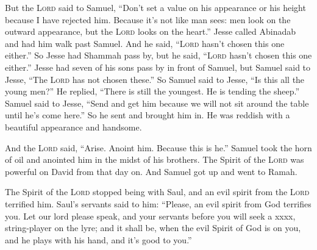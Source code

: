 \begin{inparaenum}
     But the \textsc{Lord} said to Samuel, ``Don't set a value on his appearance or his height because I have rejected him. Because it's not like man sees: men look on the outward appearance, but the \textsc{Lord} looks on the heart.''%
     Jesse called Abinadab and had him walk past Samuel. And he said, ``\textsc{Lord} hasn't chosen this one either.''%
     So Jesse had Shammah pass by, but he said, ``\textsc{Lord} hasn't chosen this one either.''%
     Jesse had seven of his sons pass by in front of Samuel, but Samuel said to Jesse, ``The \textsc{Lord} has not chosen these.''%
     So Samuel said to Jesse, ``Is this all the young men?'' He replied, ``There is still the youngest. He is tending the sheep.'' Samuel said to Jesse, ``Send and get him because we will not sit around the table until he's come here.''%
     So he sent and brought him in. He was reddish with a beautiful appearance and handsome.%
    
    And the \textsc{Lord} said, ``Arise. Anoint him. Because this is he.''%
     Samuel took the horn of oil and anointed him in the midst of his brothers. The Spirit of the \textsc{Lord} was powerful on David from that day on. And Samuel got up and went to Ramah.%
    
     The Spirit of the \textsc{Lord} stopped being with Saul, and an evil spirit from the \textsc{Lord} terrified him.%
     Saul's servants said to him: ``Please, an evil spirit from God terrifies you.%
     Let our lord please speak, and your servants before you will seek a xxxx, string-player on the lyre; and it shall be, when the evil Spirit of God is on you, and he plays with his hand, and it's good to you.''%
    

\end{inparaenum}
